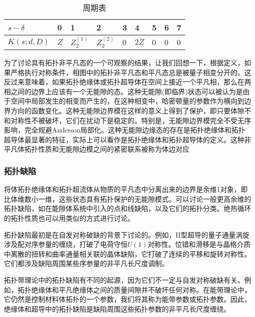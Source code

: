 \documentclass[a4paper]{article}
\numberwithin{equation}{subsection}
\begin{document}
\begin{table}[h]
    \centering
    \begin{tabular}{|l|l|l|l|l|l|l|l|l|}
    \hline
    $s-\delta$ & 0   & 1           & 2           & 3 & 4    & 5 & 6 & 7 \\ \hline
    $K(s;d,D)$ & $Z$ & $Z_2^{(1)}$ & $Z_2^{(2)}$ & 0 & $2Z$ & 0 & 0 & 0 \\ \hline
    \end{tabular}
    \caption{周期表}
\end{table}

为了讨论具有拓扑非平凡态的一个可观察的结果，让我们回想一下，根据定义，如果严格执行对称条件，相图中的拓扑非平凡态和平凡态总是被量子相变分开的。这反过来意味着，如果拓扑绝缘体或拓扑超导体在空间上接近一个平凡相，那么在两相之间的边界上应该有一个无能隙的态。这种无能隙(即临界)状态可以被认为是由于空间中局部发生的相变而产生的，在这种相变中，哈密顿量的参数作为横向到边界方向的函数变化。这种无能隙边界模在这样的意义上得到了保护，即只要体隙不和对称性不被破坏，它们在扰动下是稳定的。特别是，无能隙边界模完全不受无序影响，完全规避Anderson局部化。这种无能隙边缘态的存在是拓扑绝缘体和拓扑超导体最显著的特征，实际上可以看作是拓扑绝缘体和拓扑超导体的定义。这种非平凡体拓扑性质和无能隙边模之间的紧密联系被称为体边对应

\subsubsection{拓扑缺陷}
将体拓扑绝缘体和拓扑超流体从物质的平凡态中分离出来的边界是余维1对象，即比体维数小一维，这些状态具有拓扑保护的无能隙模式。可以讨论一般更高余维的拓扑缺陷，如在能隙体系统中引入的点和线缺陷，以及它们的拓扑分类。绝热循环的拓扑性质也可以用类似的方式进行讨论。

拓扑缺陷最初是在自发对称破缺的背景下讨论的。例如，II型超导的量子通量涡旋涉及配对序参量的缠绕，打破了电荷守恒$U(1)$对称性。位错和滑移是与晶格介质中离散的扭转和曲率通量相关联的晶体缺陷，它打破了连续的平移和旋转对称性。它们都涉及缺陷周围某些序参量的非平凡长尺度调制。

拓扑带理论中的拓扑缺陷有不同的起源，因为它们不一定与自发对称破缺有关。例如，拓扑绝缘体和平凡绝缘体之间的质量间隙并不破坏任何对称。在能带理论中，它仍然是控制材料体拓扑的一个参数，我们将其称为能带参数或拓扑参数。因此，绝缘体和超导中的拓扑缺陷是缺陷周围这些拓扑参数的非平凡长尺度缠绕。
\end{document}

